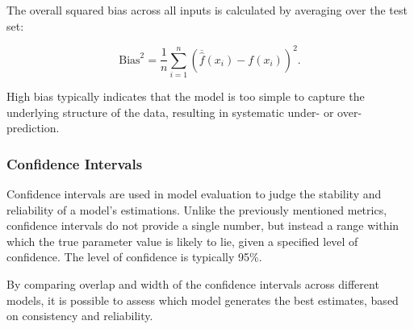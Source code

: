 The overall squared bias across all inputs is calculated by averaging over the test set:

\begin{equation}
\text{Bias}^2 = \frac{1}{n} \sum_{i=1}^{n} (\overline{\hat{f}}(x_i) - f(x_i))^{2}.
\end{equation}

High bias typically indicates that the model is too simple to capture the underlying structure of the data, resulting in systematic under- or over-prediction.



\subsubsection{Confidence Intervals}
Confidence intervals are used in model evaluation to judge the stability and reliability of a model's estimations. Unlike the previously mentioned metrics, confidence intervals do not provide a single number, but instead a range within which the true parameter value is likely to lie, given a specified level of confidence. The level of confidence is typically 95\%.

By comparing overlap and width of the confidence intervals across different models, it is possible to assess which model generates the best estimates, based on consistency and reliability.